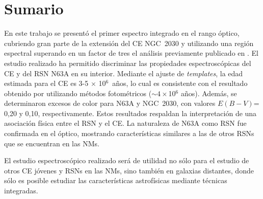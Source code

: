 \documentclass[baaa]{baaa}
\begin{document}
\section{Sumario}
En este trabajo se presentó el primer espectro integrado en el rango óptico, cubriendo gran parte de la extensión del CE NGC~2030 y utilizando una región espectral superando  en un factor de tres el análisis previamente publicado en \citet{Santos+1995}. 
El estudio realizado ha permitido discriminar las propiedades espectroscópicas del CE y del RSN N63A en su interior. Mediante el ajuste de \textit{templates}, la edad estimada para el CE es  3-5 $\times$ 10$^{6}$~años, lo cual es consistente con el resultado obtenido por \citet{Laval+1986} utilizando  
métodos fotométricos ($\sim 4\times$10$^{6}$ años). Además, se  determinaron excesos de color para N63A y NGC~2030, con valores $E(B-V)$= 0,20 y 0,10, respectivamente. Estos resultados respaldan la interpretación de una asociación física entre el RSN y el CE. 
La naturaleza de N63A como RSN fue confirmada en el óptico, mostrando características similares a las de otros RSNs que se encuentran en las NMs. 

El estudio espectroscópico realizado será de utilidad no sólo para el estudio de otros CE jóvenes y  RSNs en las NMs, sino también en galaxias %
distantes, donde sólo es posible estudiar las características astrofísicas %
mediante técnicas integradas.



\end{document}
